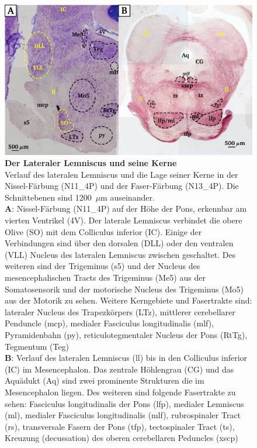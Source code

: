 \documentclass[12pt,a4paper,pdftex]{article}
\begin{document}
\begin{figure}[H]
    \centering
    \includegraphics[width = \textwidth]{pictures/auditory/lateral_lemniscus.png}
    \caption[Der Lateraler Lemniscus und seine Kerne]{\textbf{Der Lateraler Lemniscus und seine Kerne}\\ 
    Verlauf des lateralen Lemniscus und die Lage seiner Kerne in der Nissel-Färbung (N11\_4P) und der Faser-Färbung (N13\_4P). Die Schnittebenen sind 1200~$\mu$m auseinander.\\
    \textbf{A}: Nissel-Färbung (N11\_4P) auf der Höhe der Pons, erkennbar am vierten Ventrikel (4V).
    Der laterale Lemniscus verbindet die obere Olive (SO) mit dem Colliculus inferior (IC). Einige der Verbindungen sind über den dorsalen (DLL) oder den ventralen (VLL) Nucleus des lateralen Lemniscus zwischen geschaltet. 
    Des weiteren sind der Trigeminus (s5) und der Nucleus des mesencephalischen Tracts des Trigeminus (Me5) aus der Somatosensorik und der motorische Nucleus des Trigeminus (Mo5) aus der Motorik zu sehen. 
    Weitere Kerngebiete und Fasertrakte sind: lateraler Nucleus des Trapezkörpers (LTz), mittlerer cerebellarer Penduncle (mcp), medialer Fasciculus longitudinalis (mlf), Pyramidenbahn (py), reticulotegmentaler Nucleus der Pons (RtTg), Tegmentum (Teg)\\
    \textbf{B}: Verlauf des lateralen Lemniscus (ll) bis in den Colliculus inferior (IC) im Mesencephalon. Das zentrale Höhlengrau (CG) und das Aquädukt (Aq) sind zwei prominente Strukturen die im Mesencephalon liegen. Des weiteren sind folgende Fasertrakte zu sehen: Fasciculus longitudinalis der Pons (lfp), medialer Lemniscus (ml), medialer Fasciculus longitudinalis (mlf), rubrospinaler Tract (rs), transversale Fasern der Pons (tfp), tectospinaler Tract (ts), Kreuzung (decussation) des oberen cerebellaren Peduncles (xscp)}
    \label{fig:lateraler_lemniscus}
\end{figure}
\end{document}
